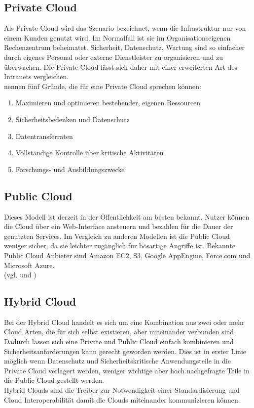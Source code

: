 \subsection{Private Cloud}
Als Private Cloud wird das Szenario bezeichnet, wenn die Infrastruktur nur von einem Kunden genutzt wird. Im Normalfall ist sie im Organisationseigenen Rechenzentrum beheimatet. Sicherheit, Datenschutz, Wartung sind so einfacher durch eigenes Personal oder externe Dienstleister zu organisieren und zu überwachen. Die Private Cloud lässt sich daher mit einer erweiterten Art des Intranets vergleichen. \cite[S. 879]{Jadeja.2012} \\
\cite{Tharam.2010} nennen fünf Gründe, die für eine Private Cloud sprechen können:
\begin{enumerate}
\item Maximieren und optimieren bestehender, eigenen Ressourcen
\item Sicherheitsbedenken und Datenschutz
\item Datentransferraten
\item Vollständige Kontrolle über kritische Aktivitäten
\item Forschungs- und Ausbildungszwecke
\end{enumerate}

\subsection{Public Cloud}
Dieses Modell ist derzeit in der Öffentlichkeit am besten bekannt. Nutzer können die Cloud über ein Web-Interface ansteuern und bezahlen für die Dauer der genutzten Services. Im Vergleich zu anderen Modellen ist die Public Cloud weniger sicher, da sie leichter zugänglich für bösartige Angriffe ist. Bekannte Public Cloud Anbieter sind Amazon EC2, S3, Google AppEngine, Force.com und Microsoft Azure. \\
(vgl. \cite{Jadeja.2012} und \cite{Tharam.2010})
	
\subsection{Hybrid Cloud}
Bei der Hybrid Cloud handelt es sich um eine Kombination aus zwei oder mehr Cloud Arten, die für sich selbst existieren, aber miteinander verbunden sind. Dadurch lassen sich eine Private und Public Cloud einfach kombinieren und Sicherheitsanforderungen kann gerecht geworden werden. Dies ist in erster Linie möglich wenn Datenschutz und Sicherheitskritische Anwendungsteile in die Private Cloud verlagert werden, weniger wichtige aber hoch nachgefragte Teile in die Public Cloud gestellt werden.\\
Hybrid Clouds sind die Treiber zur Notwendigkeit einer Standardisierung und Cloud Interoperabilität damit die Clouds miteinander kommunizieren können.

